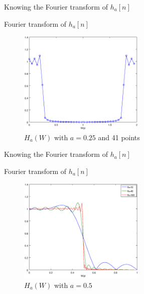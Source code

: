\documentclass[envcountsect,dvips]{beamer}
\begin{document}
\begin{frame}{Knowing the Fourier transform of $h_a[n]$}
\begin{block}{Fourier transform of $h_a[n]$}
\begin{figure}[!htb]
\centering
\includegraphics[width=6cm]{images/XW.eps}
\caption{$H_a(W)$ with $a=0.25$ and 41 points}
\label{fig:XW}
\end{figure}  
\end{block}
\end{frame}

\begin{frame}{Knowing the Fourier transform of $h_a[n]$}
\begin{block}{Fourier transform of $h_a[n]$}
\begin{figure}[!htb]
\centering
\includegraphics[width=6cm]{images/XW5.eps}
\caption{$H_a(W)$ with $a=0.5$}
\label{fig:XW5}
\end{figure}  
\end{block}
\end{frame}

\end{document}
